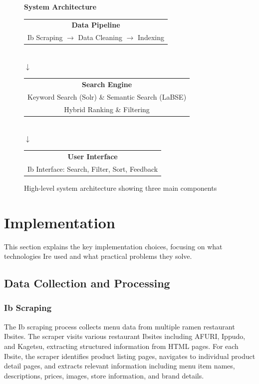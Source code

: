 \documentclass[11pt,a4paper]{article}
\begin{document}
\begin{figure}[H]
\centering
\textbf{System Architecture}\\
\vspace{0.3cm}
\begin{tabular}{|c|}
\hline
\textbf{Data Pipeline} \\
Ib Scraping $\rightarrow$ Data Cleaning $\rightarrow$ Indexing \\
\hline
\end{tabular}\\
\vspace{0.2cm}
$\downarrow$\\
\vspace{0.2cm}
\begin{tabular}{|c|}
\hline
\textbf{Search Engine} \\
Keyword Search (Solr) \& Semantic Search (LaBSE) \\
Hybrid Ranking \& Filtering \\
\hline
\end{tabular}\\
\vspace{0.2cm}
$\downarrow$\\
\vspace{0.2cm}
\begin{tabular}{|c|}
\hline
\textbf{User Interface} \\
Ib Interface: Search, Filter, Sort, Feedback \\
\hline
\end{tabular}
\caption{High-level system architecture showing three main components}
\end{figure}

\section{Implementation}

This section explains the key implementation choices, focusing on what technologies Ire used and what practical problems they solve.

\subsection{Data Collection and Processing}

\subsubsection{Ib Scraping}

The Ib scraping process collects menu data from multiple ramen restaurant Ibsites. The scraper visits various restaurant Ibsites including AFURI, Ippudo, and Kagetsu, extracting structured information from HTML pages. For each Ibsite, the scraper identifies product listing pages, navigates to individual product detail pages, and extracts relevant information including menu item names, descriptions, prices, images, store information, and brand details.
\end{document}
